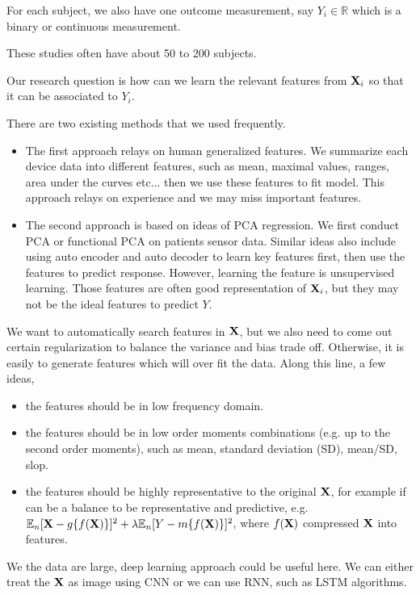 \documentclass[12pt]{article}
\def\bbR{{\mathbb{R}}} %
\def\bbE{{\mathbb{E}}} %
\def\bX{{\bf X}}
\begin{document}
For each subject, we also have one outcome measurement, say $Y_i \in \bbR $ which is a binary or continuous measurement.

These studies often have about 50 to 200 subjects. 

Our research question is how can we learn the relevant features from $\bX_i$ so that it can be associated to $Y_i$.

There are two existing methods that we used frequently.
\begin{itemize}
	\item The first approach relays on human generalized features. We summarize each device data into different features, such as mean, maximal values, ranges, area under the curves etc... then we use these features to fit model. This approach relays on experience and we may miss important features. 
	\item The second approach is based on ideas of PCA regression. We first conduct PCA or functional PCA on patients sensor data. Similar ideas also include using auto encoder and auto decoder to learn key features first, then use the features to predict response. However, learning the feature is unsupervised learning. Those features are often good representation of $\bX_i$, but they may not be the ideal features to predict $Y$.
\end{itemize}

We want to automatically search features in $\bX$, but we also need to come out certain regularization to balance the variance and bias trade off.  Otherwise, it is easily to generate features which will over fit the data. Along this line, a few ideas,
\begin{itemize}
	\item the features should be in low frequency domain.
	\item the features should be in low order moments combinations (e.g. up to the second order moments), such as mean, standard deviation (SD), mean/SD, slop. 
	\item the features should be highly representative to the original $\bX$, for example if can be a balance to be representative and predictive, e.g. $\bbE_n [\bX - g\{f(\bX)\}]^2+\lambda\bbE_n [Y-m\{f(\bX)\}]^2$, where $f(\bX)$ compressed $\bX$ into features.
\end{itemize}

We the data are large, deep learning approach could be useful here. We can either treat the $\bX$ as image using CNN or we can use RNN, such as LSTM algorithms. 
\end{document}

